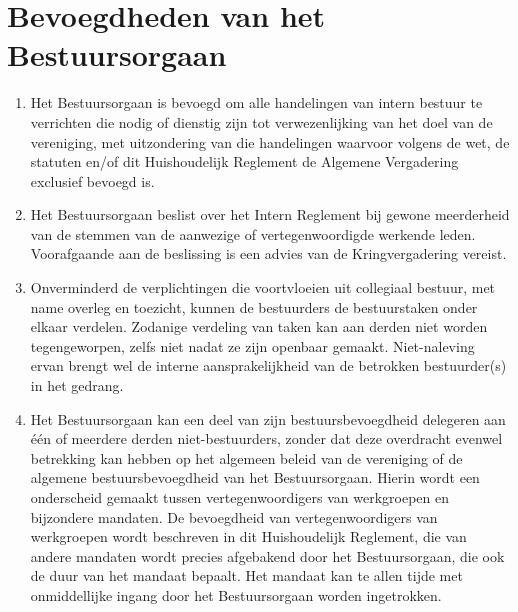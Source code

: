  \section{Bevoegdheden van het Bestuursorgaan}
    \begin{enumerate}
    \item Het Bestuursorgaan is bevoegd om alle handelingen van intern bestuur te verrichten die nodig of dienstig zijn tot verwezenlijking van het doel van de vereniging, met uitzondering van die handelingen waarvoor volgens de wet, de statuten en/of dit Huishoudelijk Reglement de Algemene Vergadering exclusief bevoegd is.
    \item Het Bestuursorgaan beslist over het Intern Reglement bij gewone meerderheid van de stemmen van de aanwezige of vertegenwoordigde werkende leden. Voorafgaande aan de beslissing is een advies van de Kringvergadering vereist.
    \item Onverminderd de verplichtingen die voortvloeien uit collegiaal bestuur, met name overleg en toezicht, kunnen de bestuurders de bestuurstaken onder elkaar verdelen. Zodanige verdeling van taken kan aan derden niet worden tegengeworpen, zelfs niet nadat ze zijn openbaar gemaakt. Niet-naleving ervan brengt wel de interne aansprakelijkheid van de betrokken bestuurder(s) in het gedrang.
    \item Het Bestuursorgaan kan een deel van zijn bestuursbevoegdheid delegeren aan één of meerdere derden niet-bestuurders, zonder dat deze overdracht evenwel betrekking kan hebben op het algemeen beleid van de vereniging of de algemene bestuursbevoegdheid van het Bestuursorgaan. Hierin wordt een onderscheid gemaakt tussen vertegenwoordigers van werkgroepen en bijzondere mandaten. De bevoegdheid van vertegenwoordigers van werkgroepen wordt beschreven in dit Huishoudelijk Reglement, die van andere mandaten wordt precies afgebakend door het Bestuursorgaan, die ook de duur van het mandaat bepaalt. Het mandaat kan te allen tijde met onmiddellijke ingang door het Bestuursorgaan worden ingetrokken.
    \end{enumerate}

